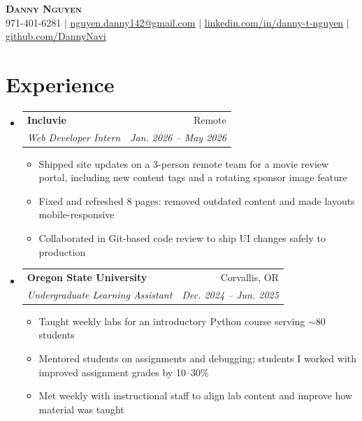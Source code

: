 \documentclass[letterpaper,11pt]{article}
\makeatletter
\newcommand{\resumeItem}[1]{%
  \item\small{%
    {#1 \vspace{-2pt}}%
  }%
}
\newcommand{\resumeSubheading}[4]{%
  \vspace{-2pt}\item%
    \begin{tabular*}{0.97\textwidth}[t]{l@{\extracolsep{\fill}}r}%
      \textbf{#1} & #2 \\%
      \textit{\small#3} & \textit{\small #4} \\%
    \end{tabular*}\vspace{-7pt}%
}
\newcommand{\resumeSubHeadingListStart}{\begin{itemize}[leftmargin=0.15in, label={}]}
\newcommand{\resumeSubHeadingListEnd}{\end{itemize}}
\newcommand{\resumeItemListStart}{\begin{itemize}[leftmargin=0.2in, itemsep=4pt, topsep=4pt, parsep=0pt]}
\newcommand{\resumeItemListEnd}{\end{itemize}\vspace{-2pt}}
\makeatother
\begin{document}
\begin{center}
    \textbf{\Huge \scshape Danny Nguyen} \\ \vspace{1pt}
    \small 971-401-6281 $|$ \href{mailto:nguyen.danny142@gmail.com}{\underline{nguyen.danny142@gmail.com}} $|$
    \href{https://www.linkedin.com/in/danny-t-nguyen/}{\underline{linkedin.com/in/danny-t-nguyen}} $|$
    \href{https://github.com/DannyNavi/}{\underline{github.com/DannyNavi}}
\end{center}

\section{Experience}
  \resumeSubHeadingListStart
    \resumeSubheading
      {Incluvie}{Remote}
      {Web Developer Intern}{Jan. 2026 -- May 2026}
      \resumeItemListStart
        \resumeItem{Shipped site updates on a 3-person remote team for a movie review portal, including new content tags and a rotating sponsor image feature}
        \resumeItem{Fixed and refreshed 8 pages: removed outdated content and made layouts mobile-responsive}
        \resumeItem{Collaborated in Git-based code review to ship UI changes safely to production}
      \resumeItemListEnd
    \resumeSubheading
      {Oregon State University}{Corvallis, OR}
      {Undergraduate Learning Assistant}{Dec. 2024 -- Jun. 2025}
      \resumeItemListStart
        \resumeItem{Taught weekly labs for an introductory Python course serving $\sim$80 students}
        \resumeItem{Mentored students on assignments and debugging; students I worked with improved assignment grades by 10--30\%}
        \resumeItem{Met weekly with instructional staff to align lab content and improve how material was taught}
      \resumeItemListEnd
  \resumeSubHeadingListEnd

\end{document}
